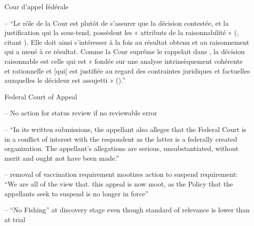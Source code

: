 \p 	Cour d'appel fédérale

-- \enquote{Le rôle de la Cour est plutôt de s’assurer que la décision contestée, et la justification qui la sous-tend, possèdent les « attributs de la raisonnabilité » (, citant ). Elle doit ainsi s’intéresser à la fois au résultat obtenu et au raisonnement qui a mené à ce résultat. Comme la Cour suprême le rappelait dans , la décision raisonnable est celle qui est « fondée sur une analyse intrinsèquement cohérente et rationnelle et [qui] est justifiée au regard des contraintes juridiques et factuelles auxquelles le décideur est assujetti » ().} 



\bigskip
{}

\p Federal Court of Appeal

-- No action for status review if no reviewable error

-- \enquote{In its written submissions, the appellant also alleges that the Federal Court is in a conflict of interest with the respondent as the latter is a federally created organization. The appellant’s allegations are serious, unsubstantiated, without merit and ought not have been made.}

-- removal of vaccination requirement mootizes action to suspend requirement: \enquote{We are all of the view that. this appeal is now moot, as the Policy that the appellants seek to suspend is no longer in force} 

-- ``No Fishing'' at discovery stage even though standard of relevance is lower than at trial


\printbibliographymcgill

